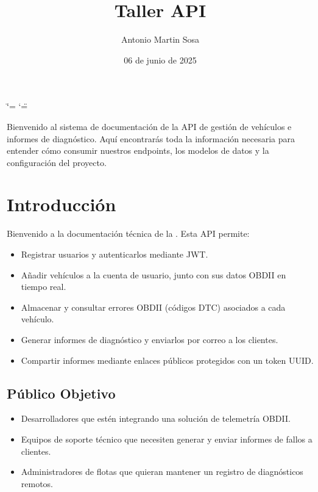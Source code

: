 \documentclass[letterpaper,10pt,spanish]{sphinxmanual}
\title{Taller API}
\date{06 de junio de 2025}
\author{Antonio Martin Sosa}
\begin{document}
\ifdefined\shorthandoff
  \ifnum\catcode`\=\string=\active\shorthandoff{=}\fi
  \ifnum\catcode`\"=\active{}\fi
\fi

\pagestyle{empty}
\sphinxmaketitle
\pagestyle{plain}
\sphinxtableofcontents
\pagestyle{normal}
\label{\detokenize{index::doc}}


\sphinxAtStartPar
Bienvenido al sistema de documentación de la API de gestión de vehículos e informes de diagnóstico. Aquí encontrarás toda la información necesaria para entender cómo consumir nuestros endpoints, los modelos de datos y la configuración del proyecto.

\sphinxstepscope


\chapter{Introducción}
\label{\detokenize{introduccion:introduccion}}\label{\detokenize{introduccion::doc}}
\sphinxAtStartPar
Bienvenido a la documentación técnica de la . Esta API permite:
\begin{itemize}
\item {} 
\sphinxAtStartPar
Registrar usuarios y autenticarlos mediante JWT.

\item {} 
\sphinxAtStartPar
Añadir vehículos a la cuenta de usuario, junto con sus datos OBD\sphinxhyphen{}II en tiempo real.

\item {} 
\sphinxAtStartPar
Almacenar y consultar errores OBD\sphinxhyphen{}II (códigos DTC) asociados a cada vehículo.

\item {} 
\sphinxAtStartPar
Generar informes de diagnóstico y enviarlos por correo a los clientes.

\item {} 
\sphinxAtStartPar
Compartir informes mediante enlaces públicos protegidos con un token UUID.

\end{itemize}


\section{Público Objetivo}
\label{\detokenize{introduccion:publico-objetivo}}\begin{itemize}
\item {} 
\sphinxAtStartPar
Desarrolladores que estén integrando una solución de telemetría OBD\sphinxhyphen{}II.

\item {} 
\sphinxAtStartPar
Equipos de soporte técnico que necesiten generar y enviar informes de fallos a clientes.

\item {} 
\sphinxAtStartPar
Administradores de flotas que quieran mantener un registro de diagnósticos remotos.

\end{itemize}
\end{document}
